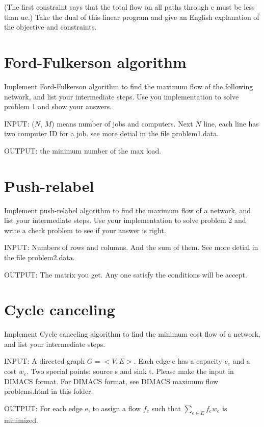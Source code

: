 \documentclass[a4paper,11pt]{article}
\begin{document}
(The first constraint says that the total flow on all paths through e must be less than ue.) Take the dual of this linear program and give an English explanation of the objective and constraints.

\section{Ford-Fulkerson algorithm}
Implement Ford-Fulkerson algorithm to find the maximum flow of the following network, and list your intermediate steps.
Use you implementation to solve problem 1 and show your answers.


\noindent
INPUT: ($N$, $M$) means number of jobs and computers. Next $N$ line, each line has two computer ID for a job. see more detial in the file problem1.data.

\noindent
OUTPUT: the minimum number of the max load.

\section{Push-relabel}
\noindent
Implement push-relabel algorithm to find the maximum flow of a network, and list your intermediate steps.
Use your implementation to solve problem 2 and write a check problem to see if your answer is right.

\noindent
INPUT: Numbers of rows and columns. And the sum of them. See more detial in the file problem2.data. 

\noindent
OUTPUT: The matrix you get. Any one satisfy the conditions will be accept. 

\section{Cycle canceling}
\noindent
Implement Cycle canceling algorithm to find the minimum cost flow of a network, and list your intermediate steps.

\noindent
INPUT: A directed graph $G = <V,E>$. Each edge e has a capacity $c_{e}$ and a cost $w_{e}$. Two special points: source s and sink t. Please make the input in DIMACS format. For DIMACS format, see DIMACS maximum flow problems.html in this folder.

\noindent
OUTPUT: For each edge e, to assign a flow $ f_{e}$ such that $ \sum _{e \in E} f_{e}w_{e}$ is minimized.
\end{document}

